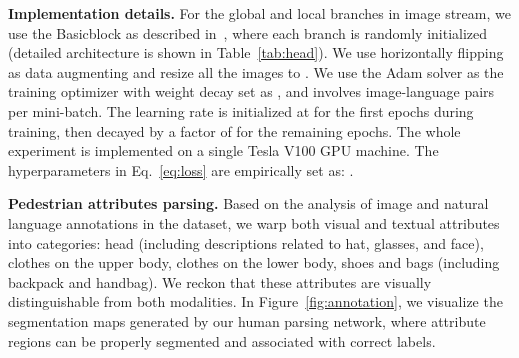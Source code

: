 \documentclass[runningheads]{llncs}
\begin{document}
\noindent\textbf{Implementation details.} For the global and local branches in image stream, we use the Basicblock as described in~\cite{he2016deep}, where each branch is randomly initialized (detailed architecture is shown in Table~\ref{tab:head}). We use horizontally flipping as data augmenting and resize all the images to .
We use the Adam solver as the training optimizer with weight decay set as , and involves  image-language pairs per mini-batch. The learning rate is initialized at  for the first  epochs during training, then decayed by a factor of  for the remaining  epochs. The whole experiment is implemented on a single Tesla V100 GPU machine. The hyperparameters in Eq.~\ref{eq:loss} are empirically set as: .

\noindent\textbf{Pedestrian attributes parsing.}
Based on the analysis of image and natural language annotations in the dataset, we warp both visual and textual attributes into  categories: head (including descriptions related to hat, glasses, and face), clothes on the upper body, clothes on the lower body, shoes and bags (including backpack and handbag).
We reckon that these attributes are visually distinguishable from both modalities. In Figure~\ref{fig:annotation}, we visualize the segmentation maps generated by our human parsing network, where attribute regions can be properly segmented and associated with correct labels.
\end{document}
